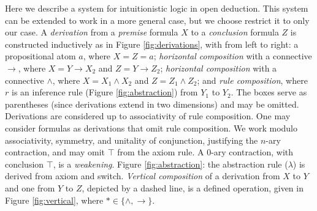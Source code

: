 \documentclass[a4paper,UKenglish,cleveref, autoref]{lipics-v2019}
\newcommand{\set}[1]{ \{ #1 \} }
\begin{document}
Here we describe a system for intuitionistic logic in open deduction. This system can be extended to work in a more general case, but we choose restrict it to only our case. A \emph{derivation} from a \emph{premise} formula $X$ to a \emph{conclusion} formula $Z$ is constructed inductively as in Figure \ref{fig:derivations}, with from left to right: a propositional atom $a$, where $X = Z = a$; \emph{horizontal composition} with a connective $\rightarrow$, where $X = Y \rightarrow X_{2}$ and $Z = Y \rightarrow Z_{2}$; \emph{horizontal composition} with a connective $\wedge$, where $X = X_{1} \wedge X_{2}$ and $Z = Z_{1} \wedge Z_{2}$; and \emph{rule composition}, where $r$ is an inference rule (Figure \ref{fig:abstraction}) from $Y_{1}$ to $Y_{2}$. The boxes serve as parentheses (since derivations extend in two dimensions) and may be omitted. Derivations are considered up to associativity of rule composition. One may consider formulas as derivations that omit rule composition. We work modulo associativity, symmetry, and unitality of conjunction, justifying the $n$-ary contraction, and may omit $\top$ from the axiom rule. A $0$-ary contraction, with conclusion $\top$, is a \emph{weakening}. Figure \ref{fig:abstraction}: the abstraction rule ($\lambda$) is derived from axiom and switch. \emph{Vertical composition} of a derivation from $X$ to $Y$ and one from $Y$ to $Z$, depicted by a dashed line, is a defined operation, given in Figure \ref{fig:vertical}, where $* \in \set{\wedge, \rightarrow}$.

\end{document}
